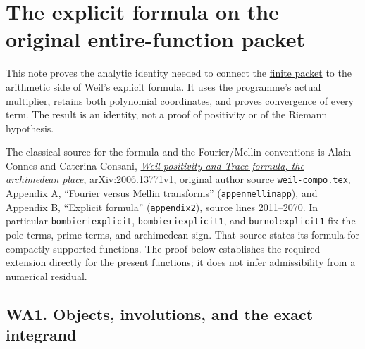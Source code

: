 \documentclass[
  10pt,
  a4paper,
]{article}
\author{}
\date{}
\begin{document}
{
\setcounter{tocdepth}{3}
\tableofcontents
}
\section{The explicit formula on the original entire-function
packet}\label{the-explicit-formula-on-the-original-entire-function-packet}

This note proves the analytic identity needed to connect the
\href{https://github.com/KokunoYumeto/zeta-function-research-reader/blob/173dbc6ed5a03235dbe7654f928f3692107db39b/workbenches/splitzero-tandem/branches/tau-zero-prime-positivity/WEIL_PACKET_DERIVATION.md}{finite
packet} to the arithmetic side of Weil's explicit formula. It uses the
programme's actual multiplier, retains both polynomial coordinates, and
proves convergence of every term. The result is an identity, not a proof
of positivity or of the Riemann hypothesis.

The classical source for the formula and the Fourier/Mellin conventions
is Alain Connes and Caterina Consani,
\href{https://arxiv.org/abs/2006.13771v1}{\emph{Weil positivity and
Trace formula, the archimedean place}, arXiv:2006.13771v1}, original
author source \texttt{weil-\allowbreak{}compo.\allowbreak{}tex}, Appendix A, ``Fourier versus
Mellin transforms'' (\texttt{appenmellinapp}), and Appendix B,
``Explicit formula'' (\texttt{appendix2}), source lines 2011--2070. In
particular \texttt{bombieriexplicit}, \texttt{bombieriexplicit1}, and
\texttt{burnolexplicit1} fix the pole terms, prime terms, and
archimedean sign. That source states its formula for compactly supported
functions. The proof below establishes the required extension directly
for the present functions; it does not infer admissibility from a
numerical residual.

\subsection{WA1. Objects, involutions, and the exact
integrand}\label{wa1.-objects-involutions-and-the-exact-integrand}
\end{document}
